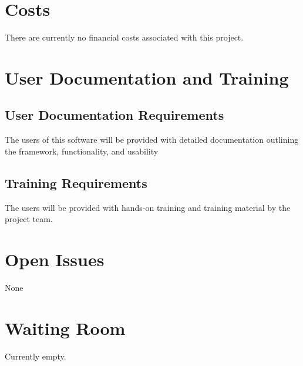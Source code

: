 \documentclass[paper=letter, fontsize=10pt]{scrartcl}
\numberwithin{equation}{section}		%
\numberwithin{figure}{section}			%
\numberwithin{table}{section}				%
\begin{document}
\section{Costs}
There are currently no financial costs associated with this project.

\section{User Documentation and Training}
\subsection{User Documentation Requirements}
The users of this software will be provided with detailed documentation outlining the framework, functionality, and usability
\subsection{Training Requirements}
The users will be provided with hands-on training and training material by the project team.

\section{Open Issues}
None

\section{Waiting Room}
Currently empty.


\end{document}
